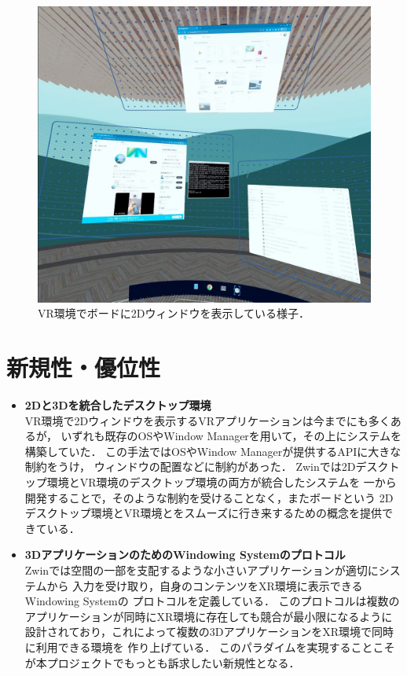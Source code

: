 \documentclass[12pt,a4paper]{jsarticle}
\begin{document}
\begin{figure}[htbp]
  \centering
  \includegraphics[keepaspectratio, width=0.5\linewidth]{fig/development/board-vr.jpeg}
  \caption{VR環境でボードに2Dウィンドウを表示している様子．}
  \label{fig:board-vr}
\end{figure}

\section{新規性・優位性}

\begin{itemize}
  \item \textbf{2Dと3Dを統合したデスクトップ環境} \\
        VR環境で2Dウィンドウを表示するVRアプリケーションは今までにも多くあるが，
        いずれも既存のOSやWindow Managerを用いて，その上にシステムを構築していた．
        この手法ではOSやWindow Managerが提供するAPIに大きな制約をうけ，
        ウィンドウの配置などに制約があった．
        Zwinでは2Dデスクトップ環境とVR環境のデスクトップ環境の両方が統合したシステムを
        一から開発することで，そのような制約を受けることなく，またボードという
        2Dデスクトップ環境とVR環境とをスムーズに行き来するための概念を提供できている．
  \item \textbf{3DアプリケーションのためのWindowing Systemのプロトコル} \\
        Zwinでは空間の一部を支配するような小さいアプリケーションが適切にシステムから
        入力を受け取り，自身のコンテンツをXR環境に表示できるWindowing Systemの
        プロトコルを定義している．
        このプロトコルは複数のアプリケーションが同時にXR環境に存在しても競合が最小限になるように
        設計されており，これによって複数の3DアプリケーションをXR環境で同時に利用できる環境を
        作り上げている．
        このパラダイムを実現することこそが本プロジェクトでもっとも訴求したい新規性となる．
\end{itemize}
\end{document}
